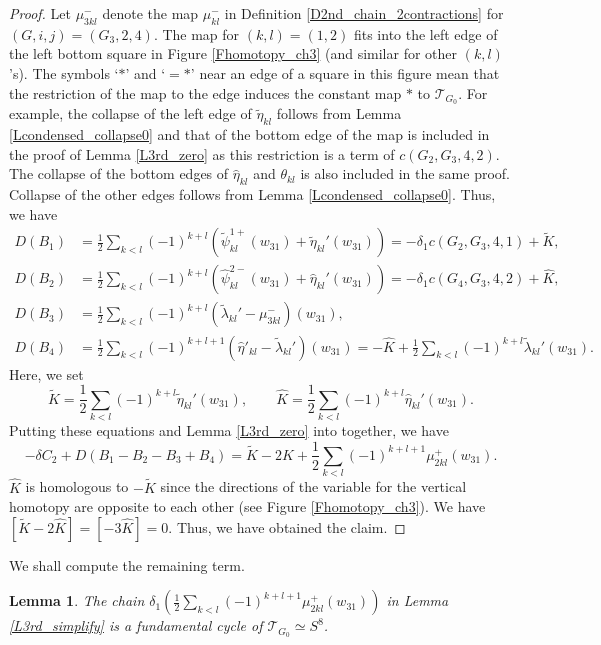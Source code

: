 \documentclass[reqno]{amsart}
\theoremstyle{definition}
\theoremstyle{plain}
\newtheorem{lem}[defi]{Lemma}
\newcommand{\TT}{\mathcal{T}} %
\begin{document}
\begin{proof}
Let $\mu_{3kl}^-$  denote  the map $\mu_{kl}^-$ in Definition \ref{D2nd_chain_2contractions} for $(G,i,j)=(G_3,2,4)$. The map for $(k,l)=(1,2)$ fits into the left edge of the left bottom square in Figure \ref{Fhomotopy_ch3} (and similar for other $(k,l)$'s).  The symbols `$*$' and `$=*$' near an edge of  a square in this figure mean that the restriction of the map to the edge induces the constant map $*$ to $\TT_{G_0}$.    For example,  the collapse of the left edge of $\tilde \eta_{kl}$ follows from Lemma \ref{Lcondensed_collapse0} and that of the bottom edge of the  map is included in the proof of Lemma \ref{L3rd_zero} as this restriction is a term of $c(G_2,G_3,4,2)$. The collapse of the bottom edges of $\hat\eta_{kl}$ and $\theta_{kl}$ is also included in the same proof. Collapse of the other edges follows from Lemma \ref{Lcondensed_collapse0}.
Thus, we have
\[
\begin{split}
D(B_1) &=\frac{1}{2}\sum_{k<l}(-1)^{k+l}(\tilde \psi_{kl}^{1+}(w_{31})+\tilde \eta_{kl}'(w_{31}))
=-\delta_1c(G_2,G_3,4,1)+\tilde K,\\
D(B_2) &=\frac{1}{2}\sum_{k<l}(-1)^{k+l}(\hat \psi_{kl}^{2-}(w_{31})+\hat \eta_{kl}'(w_{31}))
=-\delta_1c(G_4,G_3,4,2)+\hat K,\\
D(B_3)& =\frac{1}{2}\sum_{k<l}(-1)^{k+l}(\tilde \lambda_{kl}'-\mu_{3kl}^-)(w_{31}),\\
D(B_4) &=\frac{1}{2}\sum_{k<l}(-1)^{k+l+1}(\hat \eta'_{kl}-\tilde \lambda_{kl}')(w_{31})
  =-\hat K+\frac{1}{2}\sum_{k<l}(-1)^{k+l}\tilde \lambda_{kl}'(w_{31}).
\end{split}
\]Here,  we set 
\[
\tilde K=\frac{1}{2}\sum_{k<l}(-1)^{k+l}\tilde \eta_{kl}'(w_{31}),\qquad \hat K=\frac{1}{2}\sum_{k<l}(-1)^{k+l}\hat \eta_{kl}'(w_{31}).
\]  Putting these equations and Lemma \ref{L3rd_zero} into together, we have
\[
-\delta C_2+D(B_1-B_2-B_3+B_4)=\tilde K-2\hat K+\frac{1}{2}\sum_{k<l}(-1)^{k+l+1}\mu_{2kl}^+(w_{31}).
\]
$\hat K$ is homologous to $-\tilde K$ since the directions of the variable for the vertical  homotopy  are opposite to each other (see Figure \ref{Fhomotopy_ch3}). We have $[\tilde K-2\hat K]=[-3\hat K]=0$. Thus, we have obtained the claim.
\end{proof}
We shall compute the remaining term.
\begin{lem}\label{Lfundcyc_ch3}
The chain $\delta_1\left(\frac{1}{2}\sum_{k<l}(-1)^{k+l+1}\mu_{2kl}^+(w_{31})\right)$  in Lemma \ref{L3rd_simplify} is a fundamental cycle of $\TT_{G_0}\simeq S^8$.
\end{lem}
\end{document}
